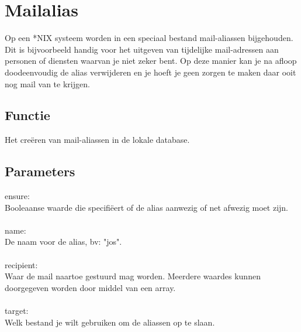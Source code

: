 \section{Mailalias}
Op een *NIX systeem worden in een speciaal bestand mail-aliassen bijgehouden. Dit is bijvoorbeeld handig voor het uitgeven van tijdelijke mail-adressen aan personen of diensten waarvan je niet zeker bent. Op deze manier kan je na afloop doodeenvoudig de alias verwijderen en je hoeft je geen zorgen te maken daar ooit nog mail van te krijgen.

\subsection{Functie}
Het cre\"{e}ren van mail-aliassen in de lokale database.

\subsection{Parameters}
ensure:\\
Booleaanse waarde die specifi\"{e}ert of de alias aanwezig of net afwezig moet zijn.\\\\
%
name:\\
De naam voor de alias, bv: "jos".\\\\
%
recipient:\\
Waar de mail naartoe gestuurd mag worden. Meerdere waardes kunnen doorgegeven worden door middel van een array.\\\\
%
target:\\
Welk bestand je wilt gebruiken om de aliassen op te slaan.\\\\
